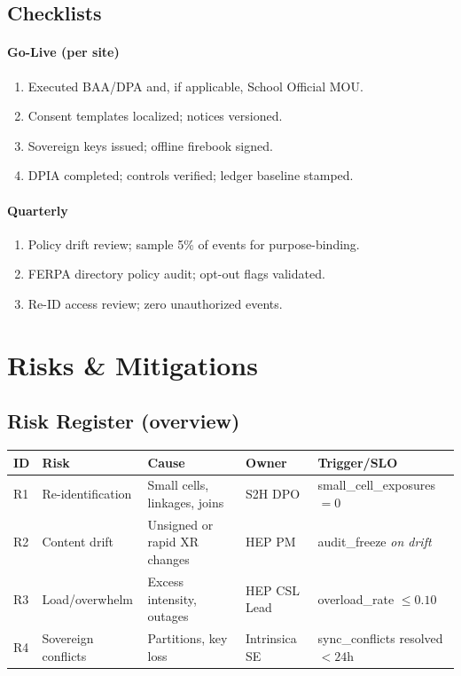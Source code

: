 \documentclass[11pt]{article}
\theoremstyle{plain}
\begin{document}
\subsection{Checklists}
\paragraph{Go-Live (per site)}
\begin{enumerate}
  \item Executed BAA/DPA and, if applicable, School Official MOU.
  \item Consent templates localized; notices versioned.
  \item Sovereign keys issued; offline firebook signed.
  \item DPIA completed; controls verified; ledger baseline stamped.
\end{enumerate}

\paragraph{Quarterly}
\begin{enumerate}
  \item Policy drift review; sample 5\% of events for purpose-binding.
  \item FERPA directory policy audit; opt-out flags validated.
  \item Re-ID access review; zero unauthorized events.
\end{enumerate}

\section{Risks \& Mitigations}

\subsection{Risk Register (overview)}
\begin{center}
\begin{tabular}{l l l l l}
\hline
\textbf{ID} & \textbf{Risk} & \textbf{Cause} & \textbf{Owner} & \textbf{Trigger/SLO} \\
\hline
R1 & Re-identification & Small cells, linkages, joins & S2H DPO & small\_cell\_exposures $=0$ \\
R2 & Content drift & Unsigned or rapid XR changes & HEP PM & audit\_freeze \textit{on drift} \\
R3 & Load/overwhelm & Excess intensity, outages & HEP CSL Lead & overload\_rate $\le 0.10$ \\
R4 & Sovereign conflicts & Partitions, key loss & Intrinsica SE & sync\_conflicts resolved $<24$h \\
\hline
\end{tabular}
\end{center}
\end{document}
